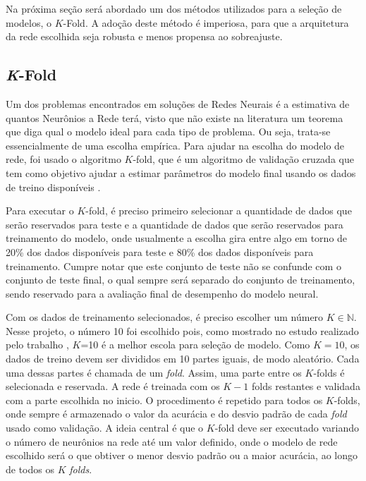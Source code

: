 Na próxima seção será abordado um dos métodos utilizados para a seleção de modelos, o $K$-Fold. A adoção deste método é imperiosa, para que a arquitetura da rede escolhida seja robusta e menos propensa ao sobreajuste.

\subsection{\textit{K}-Fold}
 
 Um dos problemas encontrados em soluções de Redes Neurais é a estimativa de quantos Neurônios a Rede terá, visto que não existe na literatura um teorema que diga qual o modelo ideal para cada tipo de problema. Ou seja, trata-se essencialmente de uma escolha empírica. Para ajudar na escolha do modelo de rede, foi usado o algoritmo $K$-fold, que é um algoritmo de validação cruzada que tem como objetivo ajudar a estimar parâmetros do modelo final usando os dados de treino disponíveis \cite{bengio2004no, kohavi1995study, rodriguez2010sensitivity, moreno2012study}.
 
  Para executar o $K$-fold, é preciso primeiro selecionar a quantidade de dados que serão reservados para teste e a quantidade de dados que serão reservados para treinamento do modelo, onde usualmente a escolha gira entre algo em torno de 20\% dos dados disponíveis para teste e 80\% dos dados disponíveis para treinamento. Cumpre notar que este conjunto de teste não se confunde com o conjunto de teste final, o qual sempre será separado do conjunto de treinamento, sendo reservado para a avaliação final de desempenho do modelo neural.
  
  Com os dados de treinamento selecionados, é preciso escolher um número $K \in \mathbb{N}$. Nesse projeto, o número 10 foi escolhido pois, como mostrado no estudo realizado pelo trabalho \cite{kohavi1995study}, $K$=10 é a melhor escola para seleção de modelo. Como $K=10$, os dados de treino devem ser divididos em 10 partes iguais, de modo aleatório. Cada uma dessas partes é chamada de um \textit{fold}. Assim, uma parte entre os $K$-folds é selecionada e reservada. A rede é treinada com os $K-1$ folds restantes e validada com a parte escolhida no inicio. O procedimento é repetido para todos os $K$-folds, onde sempre é armazenado o valor da acurácia e do desvio padrão de cada \textit{fold} usado como validação. A ideia central é que o $K$-fold deve ser executado variando o número de neurônios na rede até um valor definido, onde o modelo de rede escolhido será o que obtiver o menor desvio padrão ou a maior acurácia, ao longo de todos os $K$ \textit{folds}.
  
